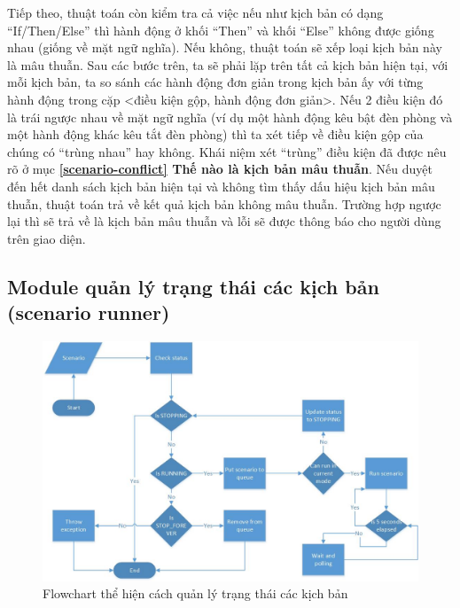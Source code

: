 \documentclass[12pt,a4paper,oneside]{extbook}
\begin{document}
\noindent
Tiếp theo, thuật toán còn kiểm tra cả việc nếu như kịch bản có dạng “If/Then/Else” thì hành động ở khối “Then” và khối “Else” không được giống nhau (giống về mặt ngữ nghĩa). Nếu không, thuật toán sẽ xếp loại kịch bản này là mâu thuẫn. Sau các bước trên, ta sẽ phải lặp trên tất cả kịch bản hiện tại, với mỗi kịch bản, ta so sánh các hành động đơn giản trong kịch bản ấy với từng hành động trong cặp <điều kiện gộp, hành động đơn giản>. Nếu 2 điều kiện đó là trái ngược nhau về mặt ngữ nghĩa (ví dụ một hành động kêu bật đèn phòng và một hành động khác kêu tắt đèn phòng) thì ta xét tiếp về điều kiện gộp của chúng có “trùng nhau” hay không. Khái niệm xét “trùng” điều kiện đã được nêu rõ ở mục \textbf{\ref{scenario-conflict} Thế nào là kịch bản mâu thuẫn}. Nếu duyệt đến hết danh sách kịch bản hiện tại và không tìm thấy dấu hiệu kịch bản mâu thuẫn, thuật toán trả về kết quả kịch bản không mâu thuẫn. Trường hợp ngược lại thì sẽ trả về là kịch bản mâu thuẫn và lỗi sẽ được thông báo cho người dùng trên giao diện. 

\subsection{Module quản lý trạng thái các kịch bản (scenario runner)}

\begin{figure}[h]
  \centering
     \includegraphics[width=15cm]{6-Flowchart-Scenario-Runner}
  \caption{Flowchart thể hiện cách quản lý trạng thái các kịch bản}\label{fig:6-Flowchart-Scenario-Runner}
\end{figure}
\end{document}
